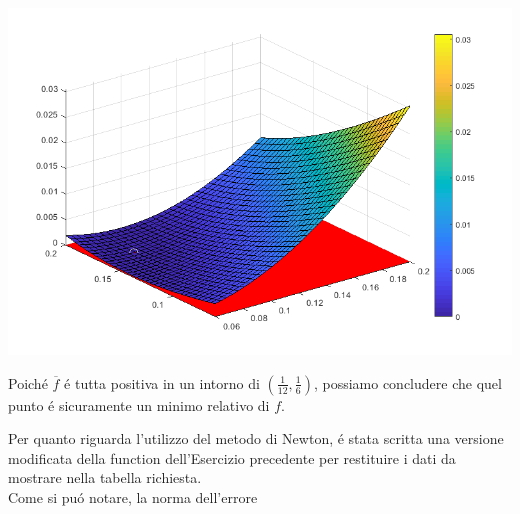 \begin{center}
	\includegraphics[scale=0.7]{cap3/3_11_sign.png}
\end{center}

\noindent Poich\'e \(\overline{f}\) \'e tutta positiva in un intorno di \((\frac{1}{12}, \frac{1}{6})\), possiamo concludere che quel punto \'e sicuramente un minimo relativo di \(f\).

\noindent Per quanto riguarda l'utilizzo del metodo di Newton, \'e stata scritta una versione modificata della function dell'Esercizio precedente per restituire i dati da mostrare nella tabella richiesta.
\\


\noindent Come si pu\'o notare, la norma dell'errore

